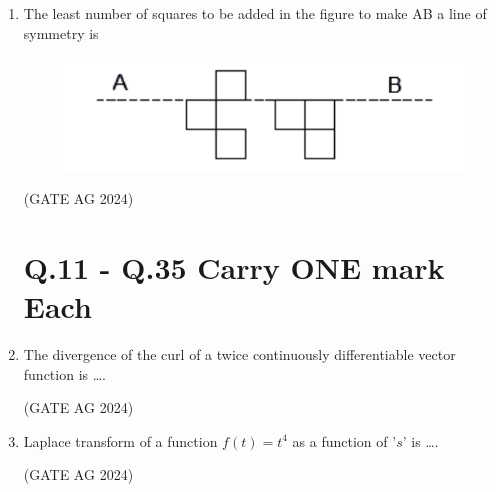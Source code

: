 \documentclass[journal]{IEEEtran}
\begin{document}
\begin{enumerate}
\medskip

\item 
The least number of squares to be added in the figure to make AB a line of symmetry is

\begin{figure}[h]
    \centering
    \includegraphics[width=0.7\columnwidth]{Figs/Screenshot 2025-08-24 211142.png}
    \caption{}
    \label{fig 1}
\end{figure}

\begin{enumerate}
\end{enumerate}
 \hfill(GATE AG 2024)\\

 \medskip

\section*{Q.11 - Q.35 Carry ONE mark Each}

\item
The divergence of the curl of a twice continuously differentiable vector function is \dots.
    \begin{enumerate}
    \end{enumerate}
     \hfill(GATE AG 2024)\\

     \medskip

\item
Laplace transform of a function $f(t) = t^4$ as a function of '$s$' is \dots.
    \begin{enumerate}
    \end{enumerate}
     \hfill(GATE AG 2024)\\


\end{enumerate}
\end{document}
